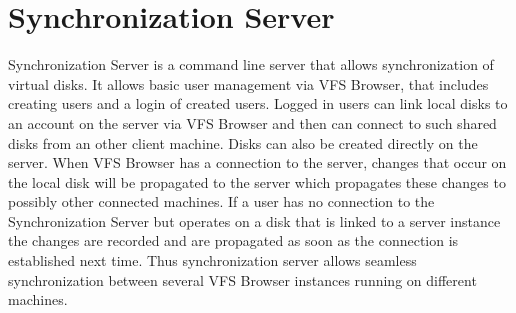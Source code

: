 \documentclass[a4paper,12pt]{article}
\begin{document}






\section{Synchronization Server}

Synchronization Server is a command line server that allows synchronization of
virtual disks. It allows basic user management via VFS Browser, that includes
creating users and a login of created users. Logged in users can link local
disks to an account on the server via VFS Browser and then can connect to such
shared disks from an other client machine. Disks can also be created directly on
the server. When VFS Browser has a connection to the server, changes that occur
on the local disk will be propagated to the server which propagates these
changes to possibly other connected machines. If a user has
no connection to the Synchronization Server but operates on a disk that is
linked to a server instance the changes are recorded and are propagated as soon
as the connection is established next time. Thus synchronization server allows
seamless synchronization between several VFS Browser instances running on
different machines.













\end{document}
